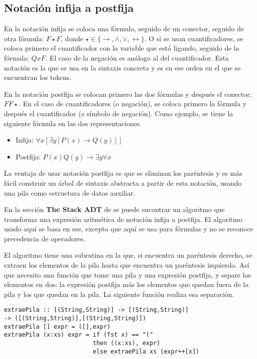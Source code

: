 \documentclass{article}
\begin{document}
\subsection{Notación infija a postfija}

En la notación infija se coloca una fórmula, seguido de un conector, seguido de otra fórmula: $F \star F$, donde $\star \in \{ \rightarrow, \land, \lor, \leftrightarrow \}$. O si se usan cuantificadores, se coloca primero el cuantificador con la variable que está ligando, seguido de la fórmula: $Q x F$. El caso de la negación es análogo al del cuantificador. Esta notación es la que se usa en la sintaxis concreta y es en ese orden en el que se encuentran los tokens.

En la notación postfija se colocan primero las dos fórmulas y después el conector: $F F \star$. En el caso de cuantificadores (o negación), se coloca primero la fórmula y después el cuantificador (o símbolo de negación). Como ejemplo, se tiene la siguiente fórmula en las dos representaciones.

\begin{itemize}
\item Infija: $\forall x [ \exists y [P(x) \rightarrow Q(y)]]$
\item Postfija: $P(x) Q(y) \rightarrow \exists y \forall x$
\end{itemize}

La ventaja de usar notación postfija es que se eliminan los paréntesis y es más fácil construir un árbol de sintaxis abstracta a partir de esta notación, usando una pila como estructura de datos auxiliar.

En la sección \textbf{The Stack ADT} de \cite{weiss} se puede encontrar un algoritmo que transforma una expresión aritmética de notación infija a postfija. El algoritmo usado aquí se basa en ese, excepto que aquí se usa para fórmulas y no se reconoce precedencia de operadores.

El algoritmo tiene una subrutina en la que, si encuentra un paréntesis derecho, se extraen los elementos de la pila hasta que encuentra un paréntesis izquierdo. Así que necesito una función que tome una pila y una expresión postfija, y separe los elementos en dos: la expresión postfija más los elementos que quedan fuera de la pila y los que quedan en la pila. La siguiente función realiza esa separación.

\begin{verbatim}
extraePila :: [(String,String)] -> [(String,String)] 
-> ([(String,String)],[(String,String)])
extraePila [] expr = ([],expr)
extraePila (x:xs) expr = if (fst x) == "("
                         then ((x:xs), expr)
                         else extraePila xs (expr++[x])
\end{verbatim}
\end{document}

